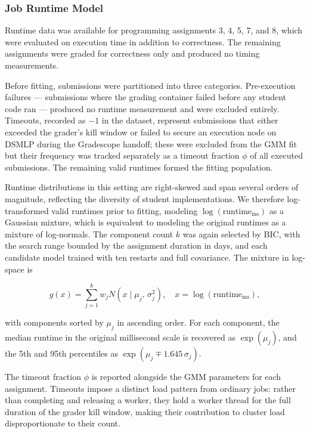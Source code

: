 \documentclass[acmlarge]{acmart}
\begin{document}
\subsubsection{Job Runtime Model}
 
Runtime data was available for programming assignments 3, 4, 5, 7, and
8, which were evaluated on execution time in addition to correctness.
The remaining assignments were graded for correctness only and
produced no timing measurements.
 
Before fitting, submissions were partitioned into three categories.
Pre-execution failures --- submissions where the grading container
failed before any student code ran --- produced no runtime measurement
and were excluded entirely. Timeouts, recorded as $-1$ in the dataset,
represent submissions that either exceeded the grader's kill window or
failed to secure an execution node on DSMLP during the Gradescope
handoff; these were excluded from the GMM fit but their frequency was
tracked separately as a timeout fraction $\phi$ of all executed
submissions. The remaining valid runtimes formed the fitting population.
 
Runtime distributions in this setting are right-skewed and span
several orders of magnitude, reflecting the diversity of student
implementations. We therefore log-transformed valid runtimes prior to
fitting, modeling $\log(\text{runtime}_{\text{ms}})$ as a Gaussian
mixture, which is equivalent to modeling the original runtimes as a
mixture of log-normals. The component count $k$ was again selected by
BIC, with the search range bounded by the assignment duration in days,
and each candidate model trained with ten restarts and full covariance.
The mixture in log-space is
 
\begin{equation}
    g(x) = \sum_{j=1}^{k} w_j {N}(x \mid \mu_j,\, \sigma_j^2),
    \quad x = \log(\text{runtime}_{\text{ms}}),
    \label{eq:runtime_gmm}
\end{equation}
 
\noindent with components sorted by $\mu_j$ in ascending order.
For each component, the median runtime in the original millisecond
scale is recovered as $\exp(\mu_j)$, and the 5th and 95th percentiles
as $\exp(\mu_j \mp 1.645\,\sigma_j)$.
 
The timeout fraction $\phi$ is reported alongside the GMM parameters
for each assignment. Timeouts impose a distinct load pattern from
ordinary jobs: rather than completing and releasing a worker, they hold
a worker thread for the full duration of the grader kill window,
making their contribution to cluster load disproportionate to their
count.
\end{document}
